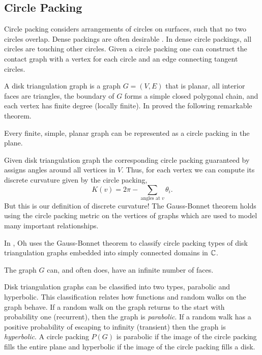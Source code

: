 \subsection{Circle Packing}
\label{sec:circle-packing}


Circle packing considers arrangements of circles on surfaces, such that
no two circles overlap. Dense packings are often desirable \cite{chang_simple_2010}.
In dense circle packings, all circles are touching other circles.
Given a circle packing one can construct the contact graph with a vertex for each
circle and an edge connecting tangent circles.

A disk triangulation graph is a graph $G=(V,E)$ that is planar, all interior faces
are triangles, the boundary of $G$ forms a simple closed polygonal chain, and each
vertex has finite degree (locally finite). 
In  proved the following remarkable theorem.

\begin{theorem}\label{thm:kat}
Every finite, simple, planar graph can be represented as a circle packing in the plane.
\end{theorem}


Given disk triangulation graph the corresponding circle packing guaranteed
by  assigns angles around all vertices in $V$.
Thus, for each vertex we can compute its discrete curvature given by
the circle packing,
$$K(v)=2\pi -\sum_{\text{angles at } v}\theta_i.$$
But this is our definition of discrete curvature!
The Gauss-Bonnet theorem holds using the circle packing metric on the vertices
of graphs which are used to model many important relationships.





In \cite{oh_criteria_2022}, Oh uses the Gauss-Bonnet theorem to classify
circle packing types of disk triangulation graphs embedded into simply
connected domains in $\mathbb{C}$.

The graph $G$ can, and often does, have
an infinite number of faces.

Disk triangulation graphs can be classified into two types, parabolic and hyperbolic.
This classification relates how functions and random walks on the graph behave.
If a random walk on the graph returns to the start with probability one (recurrent),
then the graph is \emph{parabolic}. If a random walk has a positive probability of escaping to
infinity (transient) then the graph is \emph{hyperbolic}.
A circle packing $P(G)$ is parabolic if the image of the circle packing fills the entire plane
and hyperbolic if the image of the circle packing fills a disk.

